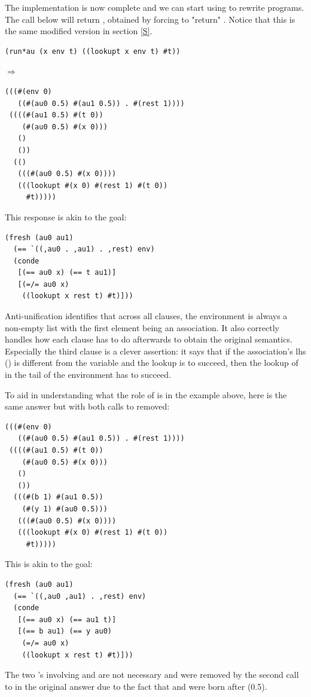 The implementation is now complete and we can start using  to rewrite programs. The call below will return , obtained by forcing  to "return" . Notice that this  is the same modified version in section \ref{S}.
\begin{lstlisting}
(run*au (x env t) ((lookupt x env t) #t))
\end{lstlisting}
$\Rightarrow$
\begin{lstlisting}
(((#(env 0)
   ((#(au0 0.5) #(au1 0.5)) . #(rest 1))))
 ((((#(au1 0.5) #(t 0))
    (#(au0 0.5) #(x 0)))
   ()
   ())
  (()
   (((#(au0 0.5) #(x 0))))
   (((lookupt #(x 0) #(rest 1) #(t 0))
     #t)))))
\end{lstlisting}
This response is akin to the goal:
\begin{lstlisting}
(fresh (au0 au1)
  (== `((,au0 . ,au1) . ,rest) env)
  (conde
   [(== au0 x) (== t au1)]
   [(=/= au0 x)
    ((lookupt x rest t) #t)]))
\end{lstlisting}
Anti-unification identifies that across all clauses, the environment is always a non-empty list with the first element being an association. It also correctly handles how each clause has to do afterwards to obtain the original semantics. Especially the third clause is a clever assertion: it says that if the association's lhs () is different from the variable  and the lookup is to succeed, then the lookup of  in the tail of the environment has to succeed.

To aid in understanding what the role of  is in the example above, here is the same answer but with both calls to  removed:
\begin{lstlisting}
(((#(env 0)
   ((#(au0 0.5) #(au1 0.5)) . #(rest 1))))
 ((((#(au1 0.5) #(t 0))
    (#(au0 0.5) #(x 0)))
   ()
   ())
  (((#(b 1) #(au1 0.5))
    (#(y 1) #(au0 0.5)))
   (((#(au0 0.5) #(x 0))))
   (((lookupt #(x 0) #(rest 1) #(t 0))
     #t)))))
\end{lstlisting}
This is akin to the goal:
\begin{lstlisting}
(fresh (au0 au1)
  (== `((,au0 ,au1) . ,rest) env)
  (conde
   [(== au0 x) (== au1 t)]
   [(== b au1) (== y au0)
    (=/= au0 x)
    ((lookupt x rest t) #t)]))
\end{lstlisting}
The two \code{==}'s involving  and  are not necessary and were removed by the second call to  in the original answer due to the fact that  and  were born after  (0.5).